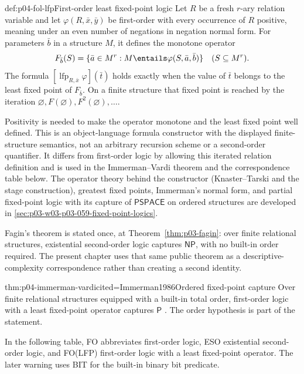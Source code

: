 \begin{hbdefinition}{def:p04-fol-lfp}{First-order least fixed-point logic}
Let \(R\) be a fresh \(r\)-ary relation variable and let
\(\varphi(R,\bar x,\bar y)\) be first-order with every occurrence of \(R\)
positive, meaning under an even number of negations in negation normal form.
For parameters \(\bar b\) in a structure \(M\), it defines the monotone
operator
\[
 F_{\bar b}(S)
 =\{\bar a\in M^r:M\entails\varphi(S,\bar a,\bar b)\}
 \quad(S\subseteq M^r).
\]
The formula
\([\operatorname{lfp}_{R,\bar x}\varphi](\bar t)\) holds exactly when the
value of \(\bar t\) belongs to the least fixed point of \(F_{\bar b}\).  On a
finite structure that fixed point is reached by the iteration
\(\varnothing,F(\varnothing),F^2(\varnothing),\ldots\).

Positivity is needed to make the operator monotone and the least fixed point
well defined.  This is an object-language formula constructor with the
displayed finite-structure semantics, not an arbitrary recursion scheme or a
second-order quantifier.  It differs from first-order logic by allowing this
iterated relation definition and is used in the Immerman--Vardi theorem and
the correspondence table below.  The operator theory behind the constructor
(Knaster--Tarski and the stage construction), greatest fixed points,
Immerman's normal form, and partial fixed-point logic with its capture of
\(\mathsf{PSPACE}\) on ordered structures are developed in
\cref{sec:p03-w03-p03-059-fixed-point-logics}.
\end{hbdefinition}

Fagin's theorem is stated once, at
Theorem~\ref{thm:p03-fagin}: over finite relational structures,
existential second-order logic captures \(\mathsf{NP}\), with no built-in
order required.  The present chapter uses that same public theorem as a
descriptive-complexity correspondence rather than creating a second identity.

\begin{hbtheorem}{thm:p04-immerman-vardi}{cited=Immerman1986}{Ordered fixed-point capture}
Over finite relational structures equipped with a built-in total order,
first-order logic with a least fixed-point operator captures \(\mathsf P\)
\cite{Vardi1982}.  The order hypothesis is part of the statement.
\end{hbtheorem}

In the following table, FO abbreviates first-order logic, ESO existential
second-order logic, and FO(LFP) first-order logic with a least fixed-point
operator.  The later warning uses BIT for the built-in binary bit predicate.

